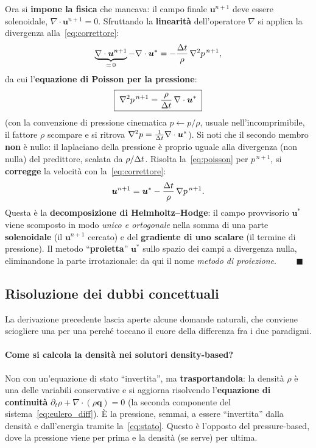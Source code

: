 Ora si \textbf{impone la fisica} che mancava: il campo finale $\bm u^{n+1}$ deve essere
solenoidale, $\nabla\cdot\bm u^{n+1}=0$. Sfruttando la \textbf{linearità} dell'operatore
$\nabla$ si applica la divergenza alla~\eqref{eq:correttore}:
\begin{equation}
  \underbrace{\nabla\cdot\bm u^{n+1}}_{=\,0}-\nabla\cdot\bm u^{*}
  = -\frac{\Delta t}{\rho}\,\nabla^2 p^{\,n+1},
\end{equation}
da cui l'\textbf{equazione di Poisson per la pressione}:
\begin{equation}
  \boxed{\;\nabla^2 p^{\,n+1} = \frac{\rho}{\Delta t}\,\nabla\cdot\bm u^{*}\;}
  \label{eq:poisson}
\end{equation}
(con la convenzione di pressione cinematica $p\leftarrow p/\rho$, usuale
nell'incomprimibile, il fattore $\rho$ scompare e si ritrova
$\nabla^2 p=\tfrac{1}{\Delta t}\nabla\cdot\bm u^{*}$). Si noti che il secondo membro
\textbf{non} è nullo: il laplaciano della pressione è proprio uguale alla divergenza
(non nulla) del predittore, scalata da $\rho/\Delta t$. Risolta la~\eqref{eq:poisson} per
$p^{\,n+1}$, si \textbf{corregge} la velocità con la~\eqref{eq:correttore}:
\begin{equation}
  \bm u^{n+1} = \bm u^{*} - \frac{\Delta t}{\rho}\,\nabla p^{\,n+1}.
  \label{eq:proiezione}
\end{equation}
Questa è la \textbf{decomposizione di Helmholtz--Hodge}: il campo provvisorio $\bm u^{*}$
viene scomposto in modo \emph{unico e ortogonale} nella somma di una parte
\textbf{solenoidale} (il $\bm u^{n+1}$ cercato) e del \textbf{gradiente di uno scalare}
(il termine di pressione). Il metodo ``\textbf{proietta}'' $\bm u^{*}$ sullo spazio dei
campi a divergenza nulla, eliminandone la parte irrotazionale: da qui il nome
\emph{metodo di proiezione}. $\qquad\blacksquare$

\subsection{Risoluzione dei dubbi concettuali}
\label{sub:dubbi_chorin}

La derivazione precedente lascia aperte alcune domande naturali, che conviene sciogliere
una per una perché toccano il cuore della differenza fra i due paradigmi.

\paragraph{Come si calcola la densità nei solutori density-based?}
Non con un'equazione di stato ``invertita'', ma \textbf{trasportandola}: la densità
$\rho$ è una delle variabili conservative e si aggiorna risolvendo l'\textbf{equazione di
continuità} $\partial_t\rho + \nabla\cdot(\rho\bm q)=0$ (la seconda componente del
sistema~\eqref{eq:eulero_diff}). È la pressione, semmai, a essere ``invertita'' dalla
densità e dall'energia tramite la~\eqref{eq:stato}. Questo è l'opposto del pressure-based,
dove la pressione viene per prima e la densità (se serve) per ultima.

